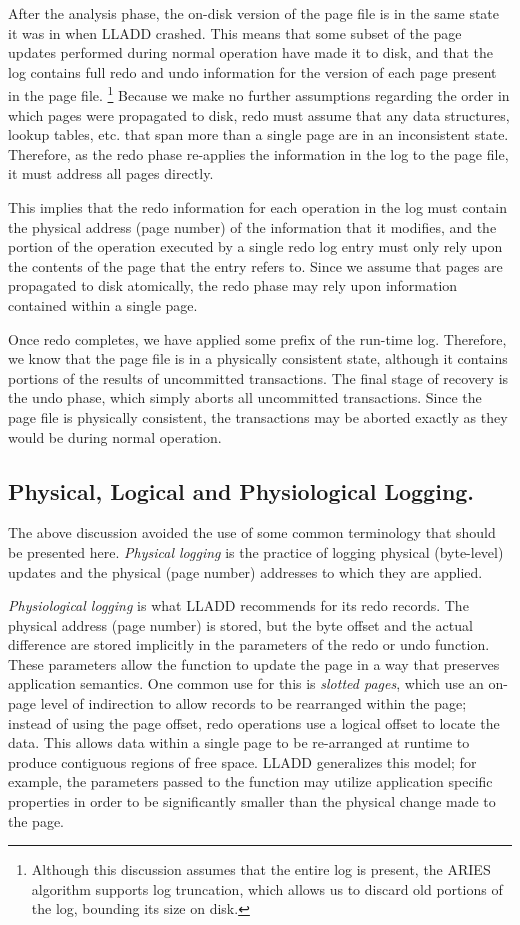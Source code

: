 \documentclass[letterpaper,english]{article}
\begin{document}
After the analysis phase, the on-disk version of the page file
is in the same state it was in when LLADD crashed. This means that
some subset of the page updates performed during normal operation
have made it to disk, and that the log contains full redo and undo
information for the version of each page present in the page file.%
\footnote{Although this discussion assumes that the entire log is present, the
ARIES algorithm supports log truncation, which allows us to discard
old portions of the log, bounding its size on disk.%
} Because we make no further assumptions regarding the order in which
pages were propagated to disk, redo must assume that any
data structures, lookup tables, etc. that span more than a single
page are in an inconsistent state. Therefore, as the redo phase re-applies
 the information in the log to the page file, it must address all pages directly. 

This implies that the redo information for each operation in the log
must contain the physical address (page number) of the information
that it modifies, and the portion of the operation executed by a single
redo log entry must only rely upon the contents of the page that the 
entry refers to. Since we assume that pages are propagated to disk
atomically, the redo phase may rely upon information contained within
a single page.

Once redo completes, we have applied some prefix of the run-time log.
Therefore, we know that the page file is in
a physically consistent state, although it contains portions of the
results of uncommitted transactions. The final stage of recovery is
the undo phase, which simply aborts all uncommitted transactions. Since
the page file is physically consistent, the transactions may be aborted
exactly as they would be during normal operation. 


\subsection{Physical, Logical and Physiological Logging.}

The above discussion avoided the use of some common terminology 
that should be presented here. {\em Physical logging } 
is the practice of logging physical (byte-level) updates
and the physical (page number) addresses to which they are applied.

{\em Physiological logging } is what LLADD recommends for its redo 
records. The physical address (page number) is stored, but the byte offset
and the actual difference are stored implicitly in the parameters
of the redo or undo function. These parameters allow the function to 
update the page in a way that preserves application semantics.
One common use for this is {\em slotted pages}, which use an on-page level of 
indirection to allow records to be rearranged within the page; instead of using the page offset, redo 
operations use a logical offset to locate the data. This allows data within
a single page to be re-arranged at runtime to produce contiguous
regions of free space. LLADD generalizes this model; for example, the parameters passed to the function may utilize application specific properties in order to be significantly smaller than the physical change made to the page.~\cite{physiological}
\end{document}
